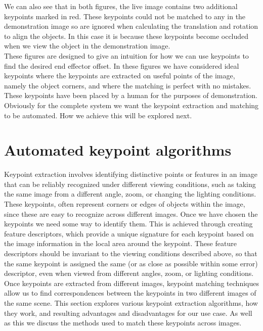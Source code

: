 We can also see that in both figures, the live image contains two additional keypoints marked in red. These keypoints could not be matched to any in the demonstration image so are ignored when calculating the translation and rotation to align the objects. In this case it is because these keypoints become occluded when we view the object in the demonstration image.\\

These figures are designed to give an intuition for how we can use keypoints to find the desired end effector offset. In these figures we have considered ideal keypoints where the keypoints are extracted on useful points of the image, namely the object corners, and where the matching is perfect with no mistakes. These keypoints have been placed by a human for the purposes of demonstration. Obviously for the complete system we want the keypoint extraction and matching to be automated. How we achieve this will be explored next.


\section{Automated keypoint algorithms}
\label{sec:keypoint-algos}
Keypoint extraction involves identifying distinctive points or features in an image that can be reliably recognized under different viewing conditions, such as taking the same image from a different angle, zoom, or changing the lighting conditions. These keypoints, often represent corners or edges of objects within the image, since these are easy to recognize across different images.
Once we have chosen the keypoints we need some way to identify them. This is achieved through creating feature descriptors, which provide a unique signature for each keypoint based on the image information in the local area around the keypoint. These feature descriptors should be invariant to the viewing conditions described above, so that the same keypoint is assigned the same (or as close as possible within some error) descriptor, even when viewed from different angles, zoom, or lighting conditions.
Once keypoints are extracted from different images, keypoint matching techniques allow us to find correspondences between the keypoints in two different images of the same scene. This section explores various keypoint extraction algorithms, how they work, and resulting advantages and disadvantages for our use case. As well as this we discuss the methods used to match these keypoints across images.\\


